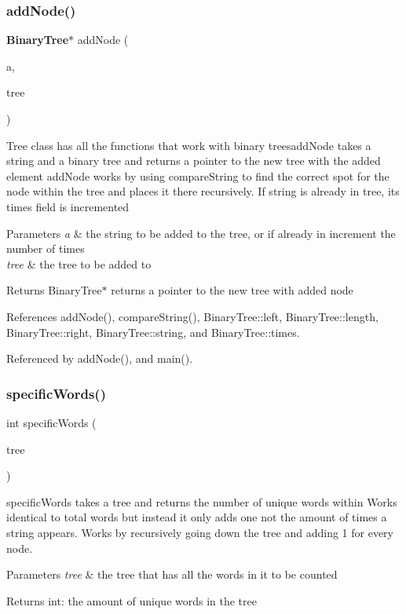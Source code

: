 \subsubsection{add\+Node()}
{\footnotesize\ttfamily \textbf{ Binary\+Tree}$\ast$ add\+Node (\begin{DoxyParamCaption}\item[{char $\ast$}]{a,  }\item[{\textbf{ Binary\+Tree} $\ast$}]{tree }\end{DoxyParamCaption})}

Tree class has all the functions that work with binary treesadd\+Node takes a string and a binary tree and returns a pointer to the new tree with the added element add\+Node works by using compare\+String to find the correct spot for the node within the tree and places it there recursively. If string is already in tree, its times field is incremented 
\begin{DoxyParams}{Parameters}
{\em a} & the string to be added to the tree, or if already in increment the number of times \\
\hline
{\em tree} & the tree to be added to \\
\hline
\end{DoxyParams}
\begin{DoxyReturn}{Returns}
Binary\+Tree$\ast$ returns a pointer to the new tree with added node 
\end{DoxyReturn}


References add\+Node(), compare\+String(), Binary\+Tree\+::left, Binary\+Tree\+::length, Binary\+Tree\+::right, Binary\+Tree\+::string, and Binary\+Tree\+::times.



Referenced by add\+Node(), and main().

\mbox{\label{tree_8h_a2baa7dc033b7a2823abeaf84f66d59ee}} 
\subsubsection{specific\+Words()}
{\footnotesize\ttfamily int specific\+Words (\begin{DoxyParamCaption}\item[{\textbf{ Binary\+Tree} $\ast$}]{tree }\end{DoxyParamCaption})}

specific\+Words takes a tree and returns the number of unique words within Works identical to total words but instead it only adds one not the amount of times a string appears. Works by recursively going down the tree and adding 1 for every node. 
\begin{DoxyParams}{Parameters}
{\em tree} & the tree that has all the words in it to be counted \\
\hline
\end{DoxyParams}
\begin{DoxyReturn}{Returns}
int\+: the amount of unique words in the tree 
\end{DoxyReturn}


